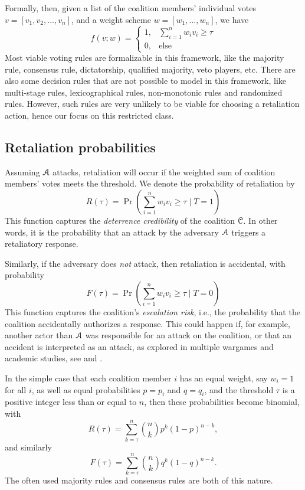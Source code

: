Formally, then, given a list of the coalition members' individual votes $v=[v_1, v_2, \dots, v_n]$, and a weight scheme $w=[w_1, \dots, w_n]$, we have 
\[
f(v;w) = 
\begin{cases}
    1, &\displaystyle\sum_{i=1}^n w_i v_i \geq \tau \\
    0, &\text{else}    
\end{cases}
\]
Most viable voting rules are formalizable in this framework, like the majority rule, consensus rule, dictatorship, qualified majority, veto players, etc. There are also some decision rules that are not possible to model in this framework, like multi-stage rules, lexicographical rules, non-monotonic rules and randomized rules. However, such rules are very unlikely to be viable for choosing a retaliation action, hence our focus on this restricted class. 

\subsection{Retaliation probabilities}
Assuming $\EuScript{A}$ attacks, retaliation will occur if the weighted sum of coalition members' votes meets the threshold. We denote the probability of retaliation by
\[R(\tau) = \Pr\left(\sum_{i=1}^n w_i v_i \geq \tau \mid T=1 \right)\]
This function captures the \emph{deterrence credibility} of the coalition $\EuScript{C}$. In other words, it is the probability that an attack by the adversary $\EuScript{A}$ triggers a retaliatory response. 

Similarly, if the adversary does \emph{not} attack, then retaliation is accidental, with probability 
\[F(\tau) = \Pr\left(\sum_{i=1}^n w_i v_i \geq \tau \mid T=0\right)\]
This function captures the coalition's \emph{escalation risk}, i.e., the probability that the coalition accidentally authorizes a response. This could happen if, for example, another actor than $\EuScript{A}$ was responsible for an attack on the coalition, or that an accident is interpreted as an attack, as explored in multiple wargames and academic studies, see \parencite{Sagan_1993} and \parencite{Blair_1993}.

\begin{example}
    \label{ex:binomial}
    In the simple case that each coalition member $i$ has an equal weight, say $w_i = 1$ for all $i$, as well as equal probabilities $p = p_i$ and $q=q_i$, and the threshold $\tau$ is a positive integer less than or equal to $n$, then these probabilities become binomial, with 
    \[R(\tau) = \sum_{k=\tau}^{n} \binom{n}{k} p^{k} (1-p)^{n-k},\]
    and similarly 
    \[F(\tau) = \sum_{k=\tau}^{n} \binom{n}{k} q^{k} (1-q)^{n-k}.\]
The often used majority rules and consensus rules are both of this nature. 
\end{example}


